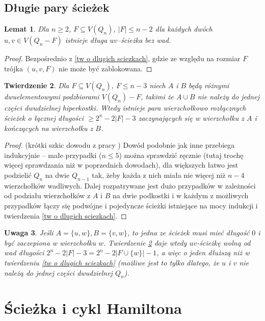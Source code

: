 \documentclass{pracamgr}
\newtheorem{theorem}{Twierdzenie}[chapter]
\newtheorem{lemma}[theorem]{Lemat}
\newtheorem{remark}[theorem]{Uwaga}
\begin{document}
  \section{Długie pary ścieżek}
   \begin{lemma}\label{zawsze dlugie sciezki}
    Dla $n\ge2$, $F\subseteq V(Q_n)$, $|F|\le n-2$ dla każdych dwóch $u,v\in V(Q_n-F)$ istnieje długa $uv$--ścieżka bez wad.
   \end{lemma}
   \begin{proof}
    Bezpośrednio z \ref{tw o dlugich sciezkach}, gdzie ze względu na rozmiar $F$ trójka $(u,v,F)$ nie może być zablokowana.
   \end{proof}
   \begin{theorem}\label{pary sciezek}
    Dla $F\subseteq V(Q_n)$, $F\le n-3$ niech $A$ i $B$ będą różnymi dwuelementowymi podzbiorami $V(Q_n)-F$, takimi że $A\cup B$ nie należy do
    jednej części dwudzielnej hiperkostki. Wtedy istnieje para wierzchołkowo rozłącznych
    ścieżek o łącznej długości $\ge 2^n-2|F|-3$ zaczynających się w wierzchołku z $A$ i kończących na wierzchołku z $B$.
   \end{theorem}
   \begin{proof}
   (krótki szkic dowodu z pracy \cite{FG2})\newline
    Dowód podobnie jak inne przebiega indukcyjnie -- małe przypadki ($n\le 5$) można sprawdzić ręcznie (tutaj trochę więcej sprawdzania niż w poprzednich dowodach),
    dla większych łatwo jest podzielić $Q_n$ na dwie $Q_{n-1}$ tak, żeby każda z nich miała nie więcej niż $n-4$ wierzchołków wadliwych.
    Dalej rozpatrywane jest dużo przypadków w zależności od podziału wierzchołków z $A$ i $B$ na dwie podkostki i w każdym z możliwych przypadków łączy się
    podwójne i pojedyncze ścieżki istniejące na mocy indukcji i twierdzenia \ref{tw o dlugich sciezkach}.
   \end{proof}
   \begin{remark}\label{a cap B=(u)}
    Jeśli $A=\{u,w\}, B=\{v,w\}$, to jedna ze ścieżek musi mieć długość $0$ i być zaczepiona w wierzchołku $w$.
    Twierdzenie \ref{pary sciezek} daje wtedy $uv$-ścieżkę
    wolną od wad długości $2^n-2|F|-3=2^n-2|F\cup\{w\}|-1$, a więc o jeden dłuższą niż w twierdzeniu \ref{tw o dlugich sciezkach}
    (możliwe jest to tylko dlatego, że $u$ i $v$ nie należą do jednej części dwudzielnej $Q_n$).
   \end{remark}
   
 \chapter{Ścieżka i cykl Hamiltona}\label{Ham}
\end{document}
